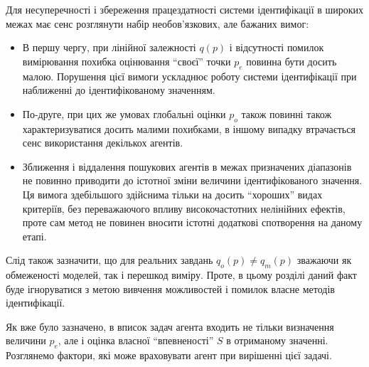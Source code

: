 Для несуперечності і збереження працездатності системи
ідентифікації в широких межах має сенс розглянути набір
необов'язкових, але бажаних вимог:

\begin{itemize}

  \item
    В першу чергу, при лінійної залежності
    $q(p)$ і відсутності помилок вимірювання похибка оцінювання
    ``своєї'' точки
    $p_e$ повинна бути досить малою. Порушення цієї вимоги
    ускладнює роботу системи ідентифікації при наближенні до
    ідентифікованому значенням.

  \item
    По-друге, при цих же умовах глобальні оцінки
    $ p_o $ також повинні також характеризуватися досить малими
    похибками, в іншому випадку втрачається сенс використання
    декількох агентів.

  \item
    Зближення і віддалення пошукових агентів в межах призначених
    діапазонів не повинно приводити до істотної зміни величини
    ідентифікованого значення. Ця вимога здебільшого здійснима
    тільки на досить ``хороших'' видах критеріїв, без переважаючого
    впливу високочастотних нелінійних ефектів, проте сам метод не
    повинен вносити істотні додаткові спотворення на даному етапі.

\end{itemize}

Слід також зазначити, що для реальних завдань
$ q_o (p) \ne q_m (p) $ зважаючи як обмеженості моделей, так і перешкод
виміру. Проте, в цьому розділі даний факт буде ігноруватися
з метою вивчення можливостей і помилок власне методів
ідентифікації.




Як вже було зазначено, в вписок задач агента входить не тільки
визначення величини
$ p_e $, але і оцінка власної ``впевненості''
$ S $ в отриманому значенні. Розглянемо фактори, які може враховувати
агент при вирішенні цієї задачі.

